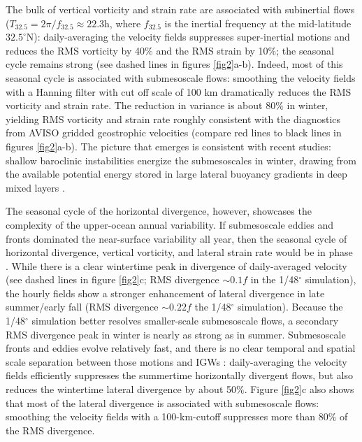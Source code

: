 \documentclass[grl]{agutex2015}
\begin{document}
\begin{article}
The bulk of vertical vorticity and strain rate are associated with subinertial flows
($T_{32.5} = 2\pi/f_{32.5}\approx 22.3$h, where $f_{32.5}$ is the inertial frequency at
the  mid-latitude $32.5^\circ$N): daily-averaging the velocity fields suppresses super-inertial
motions and reduces the RMS
vorticity by 40$\%$ and the RMS strain by 10$\%$; the seasonal
cycle remains strong (see
dashed lines in figures \ref{fig2}a-b). Indeed, most of this seasonal cycle is associated
with submesoscale flows: smoothing the velocity fields
with a Hanning filter with cut off scale of 100 km dramatically reduces the RMS
vorticity and strain rate. The reduction in variance is about 80$\%$ in winter,
yielding RMS vorticity and strain  rate roughly consistent with the diagnostics from
AVISO gridded geostrophic velocities (compare red lines to black lines in figures \ref{fig2}a-b).
The picture that emerges is consistent with recent studies: shallow baroclinic
instabilities energize the submesoscales in winter, drawing from the available
potential energy stored in large lateral buoyancy gradients in deep mixed layers \citep{sasaki_etal2014,callies_etal2015,callies_etal2016}.

The seasonal cycle of the horizontal divergence, however, showcases the complexity
of the upper-ocean annual variability. If submesoscale eddies and fronts dominated
the near-surface variability all year, then the seasonal cycle of horizontal divergence,
vertical vorticity, and lateral strain rate would be in phase \citep[e.g.,][]{sasaki_etal2014}.
While there is a clear wintertime peak in divergence of daily-averaged velocity
(see dashed lines in figure \ref{fig2}c; RMS divergence $\sim0.1 f$ in the 1/48$^\circ$
simulation), the hourly fields show
a stronger enhancement of
lateral divergence in late summer/early fall (RMS divergence $\sim0.22 f$ the 1/48$^\circ$
simulation). Because the 1/48$^\circ$ simulation better resolves
smaller-scale submesoscale flows, a secondary RMS divergence peak in winter  is
nearly as strong as in summer. Submesoscale fronts and eddies evolve
relatively fast, and there is no clear
temporal and spatial scale separation between those motions and IGWs
\citep[][]{mcwilliams2016}:
daily-averaging the velocity fields efficiently suppresses the summertime horizontally
divergent flows, but also reduces the wintertime lateral divergence by about 50$\%$.
Figure \ref{fig2}c also shows that most of the lateral divergence is associated
with submesoscale flows: smoothing the velocity fields with a 100-km-cutoff
suppresses more than 80$\%$ of the RMS divergence.



\end{article}
\end{document}
